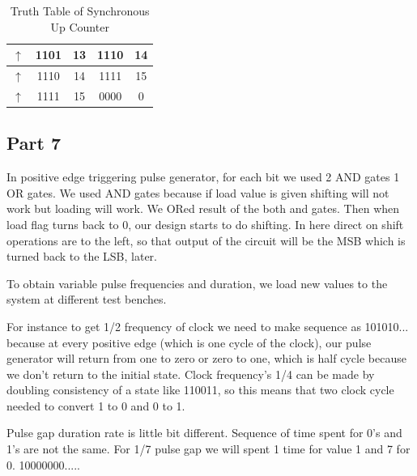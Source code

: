 \documentclass[pdftex,12pt,a4paper]{article}
\begin{document}
\begin{table}[H]
\begin{tabular}{|c|c|c|c|c|}
$\uparrow$                                                     & 1101                                                      & 13                                                        & 1110                                                   & 14                                                      \\ \hline
$\uparrow$                                                     & 1110                                                      & 14                                                        & 1111                                                   & 15                                                      \\ \hline
$\uparrow$                                                     & 1111                                                      & 15                                                        & 0000                                                   & 0                                                       \\ \hline
\end{tabular}
\caption{Truth Table of Synchronous Up Counter}
\label{tab:my-table}
\end{table}


\subsection{Part 7}
In positive edge triggering pulse generator, for each bit we used 2 AND gates 1 OR gates. We used AND gates because if load value is given shifting will not work but loading will work. We ORed result of the both and gates. Then when load flag turns back to 0, our design starts to do shifting. In here direct on shift operations are to the left, so that output of the circuit will be the MSB which is turned back to the LSB, later. 



To obtain variable pulse frequencies and duration, we load new values to the system at different test benches. 

For instance to get 1/2 frequency of clock we need to make sequence as 101010... because at every positive edge (which is one cycle of the clock), our pulse generator will return from one to zero or zero to one, which is half cycle because we don't return to the initial state. Clock frequency's 1/4 can be made by doubling consistency of a state like 110011, so this means that two clock cycle needed to convert 1 to 0 and 0 to 1.  

Pulse gap duration rate is little bit different. Sequence of time spent for 0's and 1's are not the same. For 1/7 pulse gap we will spent 1 time for value 1 and 7 for 0. 10000000.....
\end{document}
